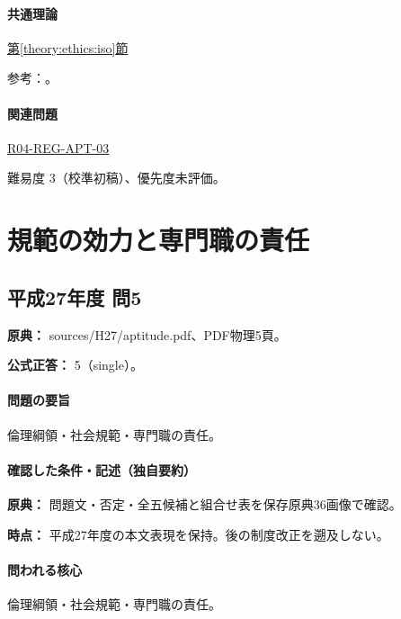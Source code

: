 \paragraph{共通理論} \hyperref[theory:ethics:iso]{第\ref*{theory:ethics:iso}節}

\par 参考：\cite{iso26000,eth54_iso_brochure}。

\paragraph{関連問題} \hyperref[q:r04-reg-apt-03]{R04-REG-APT-03}

\par 難易度 3（校準初稿）、優先度未評価。

\section{規範の効力と専門職の責任}

\subsection{平成27年度 問5}
\label{q:h27-reg-apt-05}

\noindent\textbf{原典：} sources/H27/aptitude.pdf、PDF物理5頁。

\textbf{公式正答：} 5（single）。

\paragraph{問題の要旨} 倫理綱領・社会規範・専門職の責任。

\paragraph{確認した条件・記述（独自要約）}\mbox{}\par

\noindent\textbf{原典：} 問題文・否定・全五候補と組合せ表を保存原典36画像で確認。\par

\noindent\textbf{時点：} 平成27年度の本文表現を保持。後の制度改正を遡及しない。\par

\paragraph{問われる核心} 倫理綱領・社会規範・専門職の責任。

